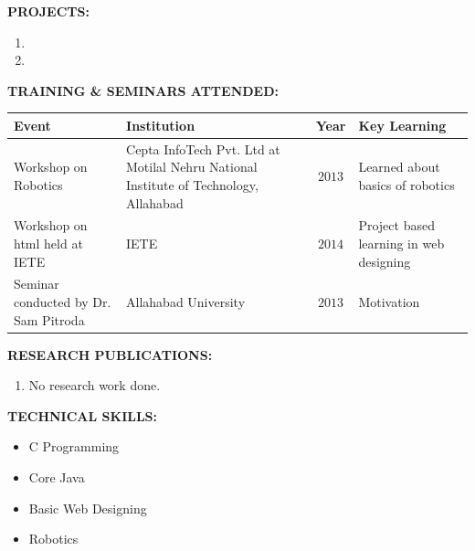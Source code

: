 \documentclass{article}
\begin{document}
\textbf{PROJECTS:}
\begin{enumerate}
	\item
    \item
\end{enumerate}

\textbf{TRAINING \& SEMINARS ATTENDED:}\\
\begin{tabular}{|p{2in}|p{2.5in}|c|p{1.3in}|}
	\hline
	\qquad \qquad \qquad \textbf{Event} & \qquad \qquad \qquad \textbf{Institution} & \textbf{Year} & \qquad \textbf{Key Learning}\\
	\hline
	Workshop on Robotics & Cepta InfoTech Pvt. Ltd at Motilal Nehru National Institute of Technology, Allahabad & $2013$ & Learned about basics of robotics\\
	\hline
	Workshop on html held at IETE & IETE & $2014$ & Project based learning in web designing\\
	\hline
	Seminar conducted by Dr. Sam Pitroda & Allahabad University & $2013$ & Motivation\\
	\hline
\end{tabular} 
\newline 
\newline

\textbf{RESEARCH PUBLICATIONS:}
\begin{enumerate}
	\item No research work done.
\end{enumerate}

\textbf{TECHNICAL SKILLS:}
\begin{itemize}
	\item C Programming
	\item Core Java
	\item Basic Web Designing
	\item Robotics
\end{itemize}
\end{document}
